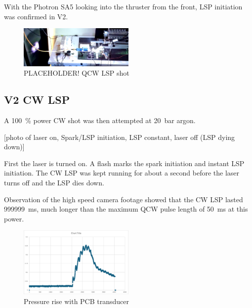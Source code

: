             With the Photron SA5 looking into the thruster from the front, LSP initiation was confirmed in V2. 

            \begin{figure}[!ht]
                \centering
                \includegraphics[width=0.5\textwidth]{assets/4 experiments/holy jesus look at this.png}
                \caption{ PLACEHOLDER! QCW LSP shot}
            \end{figure}


        \subsection{V2 CW LSP}

            A \qty{100}{\%} power CW shot was then attempted at \qty{20}{bar} argon. 

            [photo of laser on, Spark/LSP initiation, LSP constant, laser off (LSP dying down)]

            First the laser is turned on. A flash marks the spark initiation and instant LSP initiation. The CW LSP was kept running for about a second before the laser turns off and the LSP dies down.

            Observation of the high speed camera footage showed that the CW LSP lasted \qty{999999}{ms},  much longer than the maximum QCW pulse length of \qty{50}{ms} at this power.

            \begin{figure}[!ht]
                \centering
                \includegraphics[width=0.5\textwidth]{assets/4 experiments/CW pressure rise.png}
                \caption{Pressure rise with PCB transducer}
            \end{figure}

